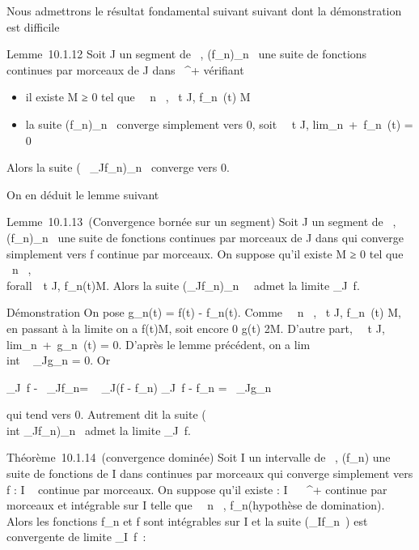\documentclass[]{article}
\begin{document}
Nous admettrons le résultat fondamental suivant suivant dont la
démonstration est difficile

Lemme~10.1.12 Soit J un segment de ~, (f_n)_n\in{}~ une
suite de fonctions continues par morceaux de J dans ~^+
vérifiant

\begin{itemize}
\itemsep1pt\parskip0pt
\item
  il existe M ≥ 0 tel que \forall~~n \in {}~,
  \forall~t \in J, f_n~(t) \leq M
\item
  la suite (f_n)_n\in{}~ converge simplement vers 0, soit
  \forall~~t \in J,
  lim_n\rightarrow~+\infty~f_n~(t) = 0
\end{itemize}

Alors la suite (\int ~
_Jf_n)_n\in{}~ converge vers 0.

On en déduit le lemme suivant

Lemme~10.1.13~(Convergence bornée sur un segment) Soit J un segment de
~, (f_n)_n\in{}~ une suite de fonctions continues par
morceaux de J dans  qui converge simplement vers f continue par
morceaux. On suppose qu'il existe M ≥ 0 tel que
\forall~n \in {}~, \\forall~~t \in J,
f_n(t)\leq M. Alors la suite
(\int  _Jf_n)_n\in{}~~
admet la limite \int  _J~f.

Démonstration On pose g_n(t) = f(t) -
f_n(t). Comme \forall~~n \in {}~,
\forall~t \in J, f_n~(t)\leq
M, en passant à la limite on a f(t)\leq M, soit encore
0 \leq g(t) \leq 2M. D'autre part, \forall~~t \in J,
lim_n\rightarrow~+\infty~g_n~(t) = 0. D'après
le lemme précédent, on a
lim\\int ~
_Jg_n = 0. Or

\left \int  _J~f
-\int ~
_Jf_n\right  =
\left \int ~
_J(f - f_n)\right
\leq\int  _J~f -
f_n =\int ~
_Jg_n

qui tend vers 0. Autrement dit la suite (\\int
 _Jf_n)_n\in{}~ admet la limite
\int  _J~f.

Théorème~10.1.14~(convergence dominée) Soit I un intervalle de ~,
(f_n) une suite de fonctions de I dans  continues par morceaux
qui converge simplement vers f : I \rightarrow~  continue par morceaux. On suppose
qu'il existe \phi : I \rightarrow~ ~^+ continue par morceaux et intégrable
sur I telle que \forall~~n \in {}~,
f_n\leq \phi (hypothèse de domination). Alors les
fonctions f_n et f sont intégrables sur I et la suite
(\int  _If_n~) est convergente
de limite \int  _I~f~:
\end{document}
